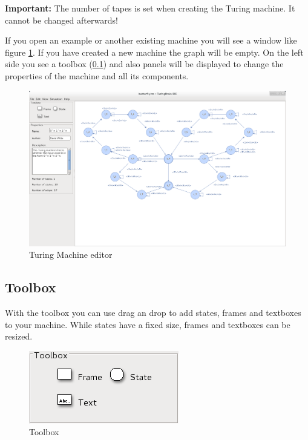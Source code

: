\documentclass[%
  a4paper,%
  11pt,%
  blue,%
  hyperref	%
  ]{tubsartcl}
\begin{document}
\textbf{Important:} The number of tapes is set when creating the Turing machine. It cannot be changed afterwards!

If you open an example or another existing machine you will see a window like figure \ref{pic:turing_editor}. If you have created a new machine the graph will be empty. On the left side you see a toolbox (\ref{sec:toolbox}) and also panels will be displayed to change the properties of the machine and all its components.
\begin{figure}[!htb]
\begin{center}
\includegraphics[scale=0.3]{graphics_gui/turing_editor.png}
\end{center}
\caption{Turing Machine editor}
\label{pic:turing_editor}
\end{figure}

\subsection{Toolbox}
\label{sec:toolbox}
With the toolbox you can use drag an drop to add states, frames and textboxes to your machine. While states have a fixed size, frames and textboxes can be resized.
\begin{figure}[!htb]
\begin{center}
\includegraphics[scale=0.5]{graphics_gui/toolbox_turing.png}
\end{center}
\caption{Toolbox}
\label{pic:toolbox}
\end{figure}
\end{document}
